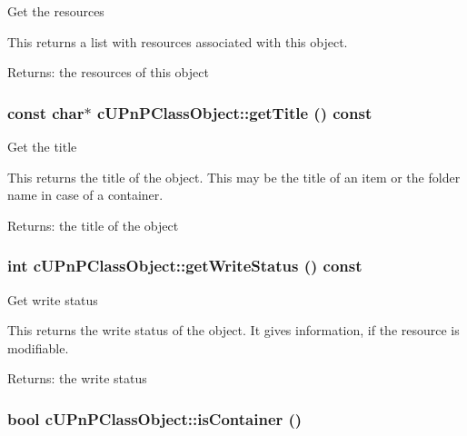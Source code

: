 Get the resources

This returns a list with resources associated with this object.

\begin{Desc}
\item[Returns:]the resources of this object \end{Desc}
\hypertarget{classcUPnPClassObject_12312c25d2a926f4d4fe5c4e0eb46f6a}{
\subsubsection[{getTitle}]{\setlength{\rightskip}{0pt plus 5cm}const char$\ast$ cUPnPClassObject::getTitle () const}}
\label{classcUPnPClassObject_12312c25d2a926f4d4fe5c4e0eb46f6a}


Get the title

This returns the title of the object. This may be the title of an item or the folder name in case of a container.

\begin{Desc}
\item[Returns:]the title of the object \end{Desc}
\hypertarget{classcUPnPClassObject_c3ac47d3b60823e7efd31f5b58b9d331}{
\subsubsection[{getWriteStatus}]{\setlength{\rightskip}{0pt plus 5cm}int cUPnPClassObject::getWriteStatus () const}}
\label{classcUPnPClassObject_c3ac47d3b60823e7efd31f5b58b9d331}


Get write status

This returns the write status of the object. It gives information, if the resource is modifiable.

\begin{Desc}
\item[Returns:]the write status \end{Desc}
\hypertarget{classcUPnPClassObject_44f963ff6d731daca5b163ddbb1cf50f}{
\subsubsection[{isContainer}]{\setlength{\rightskip}{0pt plus 5cm}bool cUPnPClassObject::isContainer ()}}
\label{classcUPnPClassObject_44f963ff6d731daca5b163ddbb1cf50f}



